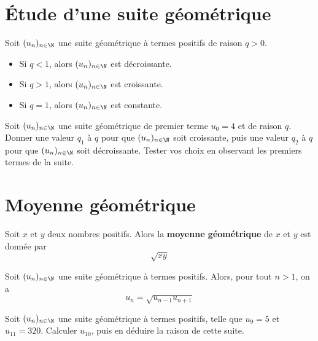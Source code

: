 \documentclass{article}
\begin{document}
\section{Étude d'une suite géométrique}
\begin{tcolorbox}
\begin{proposition}
Soit $(u_n)_{n \in \N}$ une suite géométrique à termes positifs de raison $q > 0$.
\begin{itemize}
\item Si $q < 1$, alors $(u_n)_{n \in \N}$ est décroissante. 
\item Si $q > 1$, alors $(u_n)_{n \in \N}$ est croissante. 
\item Si $q = 1$, alors $(u_n)_{n \in \N}$ est constante. 
\end{itemize}
\end{proposition}
\end{tcolorbox}
\begin{example}
Soit $(u_n)_{n \in \N}$ une suite géométrique de premier terme $u_0 = 4$ et de raison $q$. Donner une valeur $q_1$ à $q$ pour que $(u_n)_{n \in \N}$ soit croissante, puis une valeur $q_2$ à $q$ pour que $(u_n)_{n \in \N}$ soit décroissante. Tester vos choix en observant les premiers termes de la suite.
\vspace*{0.5cm}

\emptybox{4cm}
\end{example}
\section{Moyenne géométrique}
\begin{tcolorbox}
\begin{definition}
Soit $x$ et $y$ deux nombres positifs. Alors la \textbf{moyenne géométrique} de $x$ et $y$ est donnée par
\begin{equation*}
\sqrt{xy}
\end{equation*}        
\end{definition}
\end{tcolorbox}
\begin{proposition}
Soit $(u_n)_{n \in \N}$ une suite géométrique à termes positifs. Alors, pour tout $n > 1$, on a
\begin{equation*}
u_n = \sqrt{u_{n-1}u_{n+1}}
\end{equation*}
\end{proposition}
\begin{example}
Soit $(u_n)_{n \in \N}$ une suite géométrique à termes positifs, telle que $u_9 = 5$ et $u_{11} = 320$. Calculer $u_{10}$, puis en déduire la raison de cette suite.
\vspace*{0.5cm}

\emptybox{3cm}
\end{example}
\end{document}
